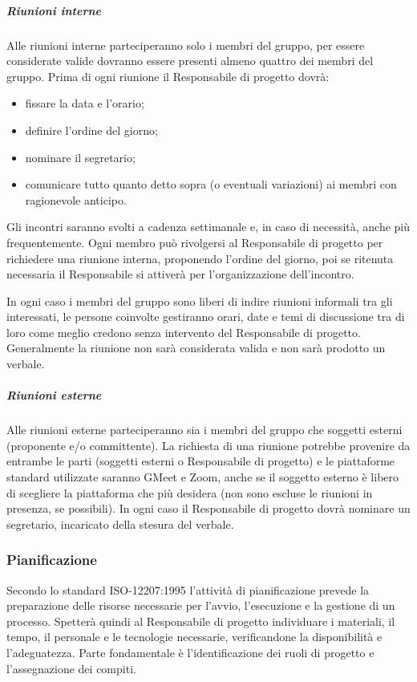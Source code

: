 \subparagraph{Riunioni interne}
Alle riunioni interne parteciperanno solo i membri del gruppo, per essere considerate valide dovranno essere presenti almeno quattro dei membri del gruppo. Prima di ogni riunione il Responsabile di progetto dovrà:
\begin{itemize}
\item fissare la data e l'orario;
\item definire l'ordine del giorno;
\item nominare il segretario;
\item comunicare tutto quanto detto sopra (o eventuali variazioni) ai membri con ragionevole anticipo.
\end{itemize}

Gli incontri saranno svolti a cadenza settimanale e, in caso di necessità, anche più frequentemente.
Ogni membro può rivolgersi al Responsabile di progetto per richiedere una riunione interna, proponendo l'ordine del giorno, poi se ritenuta necessaria il Responsabile si attiverà per l'organizzazione dell'incontro.

In ogni caso i membri del gruppo sono liberi di indire riunioni informali tra gli interessati, le persone coinvolte gestiranno orari, date e temi di discussione tra di loro come meglio credono senza intervento del Responsabile di progetto.
Generalmente la riunione non sarà considerata valida e non sarà prodotto un verbale.

\subparagraph{Riunioni esterne}
Alle riunioni esterne parteciperanno sia i membri del gruppo che soggetti esterni (proponente e/o committente). La richiesta di una riunione potrebbe provenire da entrambe le parti (soggetti esterni o Responsabile di progetto) e le piattaforme standard utilizzate saranno GMeet e Zoom, anche se il soggetto esterno è libero di scegliere la piattaforma che più desidera (non sono escluse le riunioni in presenza, se possibili). In ogni caso il Responsabile di progetto dovrà nominare un segretario, incaricato della stesura del verbale.


\subsubsection{Pianificazione}
Secondo lo standard ISO-12207:1995 l'attività di pianificazione prevede la preparazione delle risorse necessarie per l'avvio, l'esecuzione e la gestione di un processo. Spetterà quindi al Responsabile di progetto individuare i materiali, il tempo, il personale e le tecnologie necessarie, verificandone la disponibilità e l'adeguatezza. Parte fondamentale è l'identificazione dei ruoli di progetto e l'assegnazione dei compiti.

